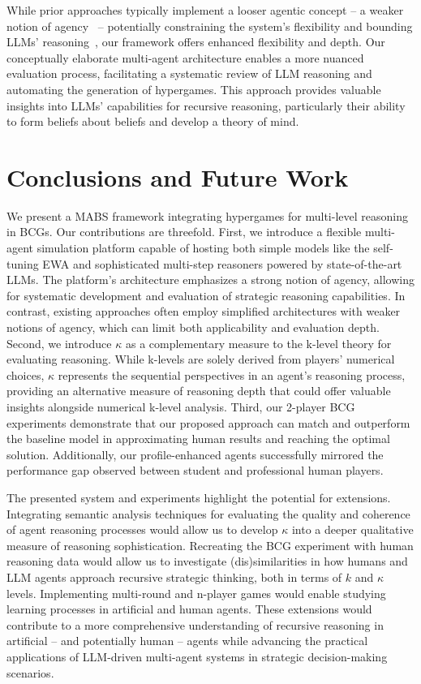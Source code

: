 \documentclass[runningheads]{llncs}
\begin{document}
While prior approaches typically implement a looser agentic concept -- a weaker notion of agency~\cite{Wooldridge_Jennings_1995} -- potentially constraining the system's flexibility and bounding LLMs' reasoning~\cite{wang2025limitsllmbasedhumansimulation}, our framework offers enhanced flexibility and depth. Our conceptually elaborate multi-agent architecture enables a more nuanced evaluation process, facilitating a systematic review of LLM reasoning and automating the generation of hypergames. This approach provides valuable insights into LLMs' capabilities for recursive reasoning, particularly their ability to form beliefs about beliefs and develop a theory of mind.

\section{Conclusions and Future Work}

We present a MABS framework integrating hypergames for multi-level reasoning in BCGs. Our contributions are threefold.
First, we introduce a flexible multi-agent simulation platform capable of hosting both simple models like the self-tuning EWA and sophisticated multi-step reasoners powered by state-of-the-art LLMs. The platform's architecture emphasizes a strong notion of agency, allowing for systematic development and evaluation of strategic reasoning capabilities. In contrast, existing approaches often employ simplified architectures with weaker notions of agency, which can limit both applicability and evaluation depth.
Second, we introduce $\kappa$ as a complementary measure to the k-level theory for evaluating reasoning. While k-levels are solely derived from players' numerical choices, $\kappa$ represents the sequential perspectives in an agent's reasoning process, providing an alternative measure of reasoning depth that could offer valuable insights alongside numerical k-level analysis. Third, our 2-player BCG experiments demonstrate that our proposed approach can match and outperform the baseline model in approximating human results and reaching the optimal solution. Additionally, our profile-enhanced agents successfully mirrored the performance gap observed between student and professional human players.


The presented system and experiments highlight the potential for extensions. Integrating semantic analysis techniques for evaluating the quality and coherence of agent reasoning processes would allow us to develop $\kappa$ into a deeper qualitative measure of reasoning sophistication. Recreating the BCG experiment with human reasoning data would allow us to investigate (dis)similarities in how humans and LLM agents approach recursive strategic thinking, both in terms of $k$ and $\kappa$ levels. Implementing multi-round and n-player games would enable studying learning processes in artificial and human agents. These extensions would contribute to a more comprehensive understanding of recursive reasoning in artificial -- and potentially human -- agents while advancing the practical applications of LLM-driven multi-agent systems in strategic decision-making scenarios.\\
\end{document}
